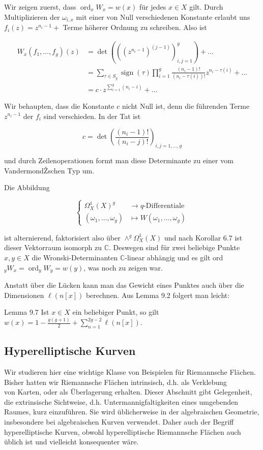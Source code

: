 \documentclass[10pt, letterpaper]{article}
\begin{document}
Wir zeigen zuerst, dass $\operatorname{ord}_{x} W_{x}=w(x)$ für jedes $x \in X$ gilt. Durch Multiplizieren der $\omega_{i, x}$ mit einer von Null verschiedenen Konstante erlaubt uns $f_{i}(z)=z^{n_{i}-1}+$ Terme höherer Ordnung zu schreiben. Also ist

$$
\begin{aligned}
W_{x}\left(f_{1}, \ldots, f_{g}\right)(z) & =\operatorname{det}\left(\left(\left(z^{n_{i}-1}\right)^{(j-1)}\right)_{i, j=1}^{g}\right)+\ldots \\
& =\sum_{\tau \in S_{g}} \operatorname{sign}(\tau) \prod_{i=1}^{g} \frac{\left(n_{i}-1\right)!}{\left(n_{i}-\tau(i)\right)!} z^{n_{i}-\tau(i)}+\ldots \\
& =c \cdot z^{\sum_{i=1}^{g}\left(n_{i}-i\right)}+\ldots
\end{aligned}
$$

Wir behaupten, dass die Konstante $c$ nicht Null ist, denn die führenden Terme $z^{n_{i}-1}$ der $f_{i}$ sind verschieden. In der Tat ist

$$
c=\operatorname{det}\left(\frac{\left(n_{i}-1\right)!}{\left(n_{i}-j\right)!}\right)_{i, j=1, \ldots, g}
$$

und durch Zeilenoperationen formt man diese Determinante zu einer vom VandermondŽschen Typ um.

Die Abbildung

$$
\left\{\begin{aligned}
\Omega_{X}^{1}(X)^{g} & \longrightarrow q \text {-Differentiale } \\
\left(\omega_{1}, \ldots, \omega_{g}\right) & \longmapsto W\left(\omega_{1}, \ldots, \omega_{g}\right)
\end{aligned}\right.
$$

ist alternierend, faktorisiert also über $\wedge^{g} \Omega_{X}^{1}(X)$ und nach Korollar 6.7 ist dieser Vektorraum isomorph zu $\mathbb{C}$. Deswegen sind für zwei beliebige Punkte $x, y \in X$ die Wronski-Determinanten $\mathbb{C}$-linear abhängig und es gilt ord ${ }_{y} W_{x}= \operatorname{ord}_{y} W_{y}=w(y)$, was noch zu zeigen war.

Anstatt über die Lücken kann man das Gewicht eines Punktes auch über die Dimensionen $\ell(n[x])$ berechnen. Aus Lemma 9.2 folgert man leicht:

Lemma 9.7 Ist $x \in X$ ein beliebiger Punkt, so gilt $w(x)=1-\frac{g(g+1)}{2}+ \sum_{n=1}^{2 g-2} \ell(n[x])$.

\subsection {Hyperelliptische Kurven}
Wir studieren hier eine wichtige Klasse von Beispielen für Riemannsche Flächen. Bisher hatten wir Riemannsche Flächen intrinsisch, d.h. als Verklebung\\
von Karten, oder als Überlagerung erhalten. Dieser Abschnitt gibt Gelegenheit, die extrinsische Sichtweise, d.h. Untermannigfaltigkeiten eines umgebenden Raumes, kurz einzuführen. Sie wird üblicherweise in der algebraischen Geometrie, insbesondere bei algebraischen Kurven verwendet. Daher auch der Begriff hyperelliptische Kurven, obwohl hyperelliptische Riemannsche Flächen auch üblich ist und vielleicht konsequenter wäre.
\end{document}
